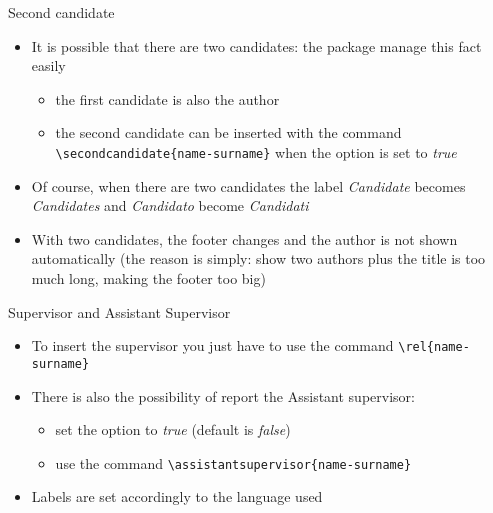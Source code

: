 \begin{frame}[t,fragile]{Second candidate}
\begin{itemize}
\item It is possible that there are two candidates: the package manage this fact easily
\begin{itemize}
\item the first candidate is also the author
\item the second candidate can be inserted with the command \verb!\secondcandidate{name-surname}! when the option  is set to \emph{true}
\end{itemize}
\item Of course, when there are two candidates the label \emph{Candidate} becomes \emph{Candidates} and \emph{Candidato} become \emph{Candidati}
\item With two candidates, the footer changes and the author is not shown automatically (the reason is simply: show two authors plus the title is too much long, making the footer too big)
\end{itemize}
\end{frame}

\begin{frame}[t,fragile]{Supervisor and Assistant Supervisor}\label{secondrel}
\begin{itemize}
\item To insert the supervisor you just have to use the command \verb!\rel{name-surname}!
\item There is also the possibility of report the Assistant supervisor:
\begin{itemize}
\item set the option  to \emph{true} (default is \emph{false})
\item use the command \verb!\assistantsupervisor{name-surname}!
\end{itemize}
\item Labels are set accordingly to the language used
\end{itemize}
\end{frame}

